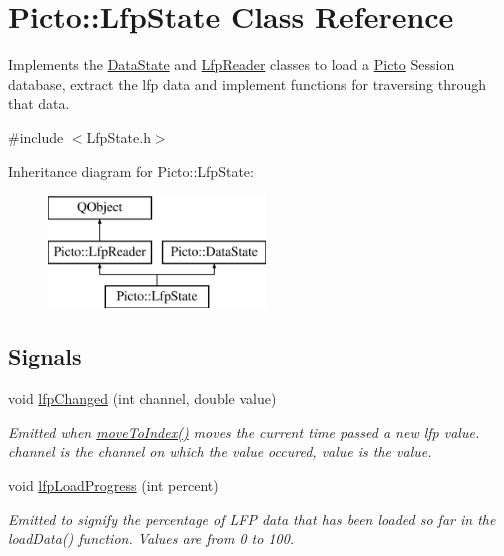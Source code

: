 \hypertarget{class_picto_1_1_lfp_state}{\section{Picto\-:\-:Lfp\-State Class Reference}
\label{class_picto_1_1_lfp_state}
}


Implements the \hyperlink{class_picto_1_1_data_state}{Data\-State} and \hyperlink{class_picto_1_1_lfp_reader}{Lfp\-Reader} classes to load a \hyperlink{namespace_picto}{Picto} Session database, extract the lfp data and implement functions for traversing through that data.  




{\ttfamily \#include $<$Lfp\-State.\-h$>$}

Inheritance diagram for Picto\-:\-:Lfp\-State\-:\begin{figure}[H]
\begin{center}
\leavevmode
\includegraphics[height=3.000000cm]{class_picto_1_1_lfp_state}
\end{center}
\end{figure}
\subsection*{Signals}
\begin{DoxyCompactItemize}
\item 
\hypertarget{class_picto_1_1_lfp_state_ac3b0a1f8b2e9fe8161f5144d388b2162}{void \hyperlink{class_picto_1_1_lfp_state_ac3b0a1f8b2e9fe8161f5144d388b2162}{lfp\-Changed} (int channel, double value)}\label{class_picto_1_1_lfp_state_ac3b0a1f8b2e9fe8161f5144d388b2162}

\begin{DoxyCompactList}\small\item\em Emitted when \hyperlink{class_picto_1_1_lfp_state_acd6593b8cb11d4aa974b629871eab6dd}{move\-To\-Index()} moves the current time passed a new lfp value. channel is the channel on which the value occured, value is the value. \end{DoxyCompactList}\item 
\hypertarget{class_picto_1_1_lfp_state_a2e4399f6f5db7a593014352b9c9fa4cb}{void \hyperlink{class_picto_1_1_lfp_state_a2e4399f6f5db7a593014352b9c9fa4cb}{lfp\-Load\-Progress} (int percent)}\label{class_picto_1_1_lfp_state_a2e4399f6f5db7a593014352b9c9fa4cb}

\begin{DoxyCompactList}\small\item\em Emitted to signify the percentage of L\-F\-P data that has been loaded so far in the load\-Data() function. Values are from 0 to 100. \end{DoxyCompactList}\end{DoxyCompactItemize}
